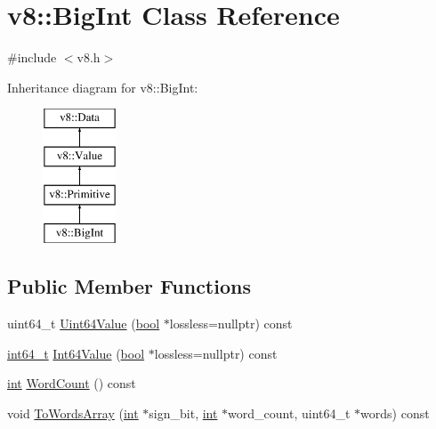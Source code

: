\hypertarget{classv8_1_1BigInt}{}\section{v8\+:\+:Big\+Int Class Reference}
\label{classv8_1_1BigInt}


{\ttfamily \#include $<$v8.\+h$>$}

Inheritance diagram for v8\+:\+:Big\+Int\+:\begin{figure}[H]
\begin{center}
\leavevmode
\includegraphics[height=4.000000cm]{classv8_1_1BigInt}
\end{center}
\end{figure}
\subsection*{Public Member Functions}
\begin{DoxyCompactItemize}
\item 
uint64\+\_\+t \mbox{\hyperlink{classv8_1_1BigInt_a32d8d340aef40da93cde35a9baf7e58d}{Uint64\+Value}} (\mbox{\hyperlink{classbool}{bool}} $\ast$lossless=nullptr) const
\item 
\mbox{\hyperlink{classint64__t}{int64\+\_\+t}} \mbox{\hyperlink{classv8_1_1BigInt_a6478543bf9a595571d76e60fd3f2af0e}{Int64\+Value}} (\mbox{\hyperlink{classbool}{bool}} $\ast$lossless=nullptr) const
\item 
\mbox{\hyperlink{classint}{int}} \mbox{\hyperlink{classv8_1_1BigInt_a840783db8ae94178040c5a8a7bb52875}{Word\+Count}} () const
\item 
void \mbox{\hyperlink{classv8_1_1BigInt_adbc582fd6ae26b6afe9b5591b5fe06e7}{To\+Words\+Array}} (\mbox{\hyperlink{classint}{int}} $\ast$sign\+\_\+bit, \mbox{\hyperlink{classint}{int}} $\ast$word\+\_\+count, uint64\+\_\+t $\ast$words) const
\end{DoxyCompactItemize}
